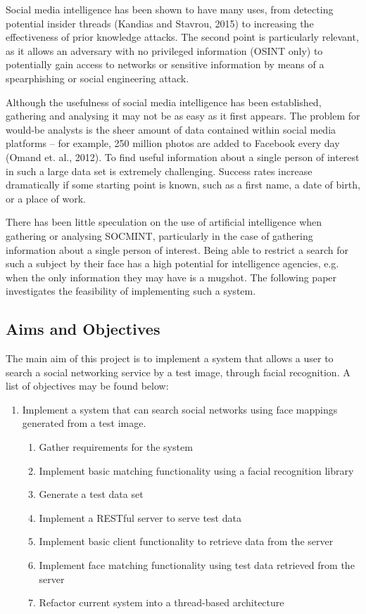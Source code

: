 \documentclass[12pt]{article}
\begin{document}
Social media intelligence has been shown to have many uses, from detecting potential insider threads (Kandias and Stavrou, 2015) to increasing the effectiveness of prior knowledge attacks. The second point is particularly relevant, as it allows an adversary with no privileged information (OSINT only) to potentially gain access to networks or sensitive information by means of a spearphishing or social engineering attack.

Although the usefulness of social media intelligence has been established, gathering and analysing it may not be as easy as it first appears. The problem for would-be analysts is the sheer amount of data contained within social media platforms – for example, 250 million photos are added to Facebook every day (Omand et. al., 2012). To find useful information about a single person of interest in such a large data set is extremely challenging. Success rates increase dramatically if some starting point is known, such as a first name, a date of birth, or a place of work.

There has been little speculation on the use of artificial intelligence when gathering or analysing SOCMINT, particularly in the case of gathering information about a single person of interest. Being able to restrict a search for such a subject by their face has a high potential for intelligence agencies, e.g. when the only information they may have is a mugshot. The following paper investigates the feasibility of implementing such a system.

\subsection{Aims and Objectives}
The main aim of this project is to implement a system that allows a user to search a social networking service by a test image, through facial recognition. A list of objectives may be found below:

\begin{center}
\begin{enumerate}
\item{Implement a system that can search social networks using face mappings generated from a test image.}
\begin{enumerate}
\item{Gather requirements for the system}
\item{Implement basic matching functionality using a facial recognition library}
\item{Generate a test data set}
\item{Implement a RESTful server to serve test data}
\item{Implement basic client functionality to retrieve data from the server}
\item{Implement face matching functionality using test data retrieved from the server}
\item{Refactor current system into a thread-based architecture}

\end{enumerate}
\end{enumerate}
\end{center}
\end{document}
